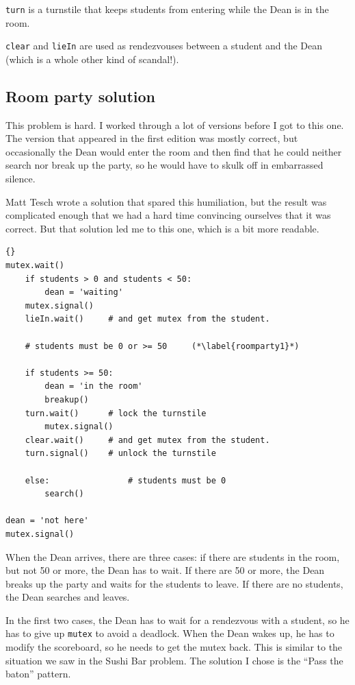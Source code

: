 \documentclass{book}
\newcommand{\clearemptydoublepage}{\newpage\cleardoublepage}
\begin{document}
{\tt turn} is a turnstile that keeps students from entering
while the Dean is in the room.

{\tt clear} and {\tt lieIn} are used as rendezvouses between
a student and the Dean (which is a whole other kind of scandal!).


\clearemptydoublepage
\subsection {Room party solution}

This problem is hard.  I worked through a lot of versions before
I got to this one.  The version that appeared in the first edition
was mostly correct, but occasionally the Dean would enter the
room and then find that he could neither search nor break up the
party, so he would have to skulk off in embarrassed silence.

Matt Tesch wrote a solution that spared this humiliation, but the
result was complicated enough that we had a hard time convincing
ourselves that it was correct.  But that solution led me to this one,
which is a bit more readable.

\begin{latin}
\begin{lstlisting}[title={Room party solution (dean)}]{}
mutex.wait()
    if students > 0 and students < 50:
        dean = 'waiting'
	mutex.signal()
	lieIn.wait()     # and get mutex from the student.

    # students must be 0 or >= 50     (*\label{roomparty1}*)

    if students >= 50:
        dean = 'in the room'
        breakup()
	turn.wait()      # lock the turnstile
        mutex.signal()
	clear.wait()     # and get mutex from the student.
	turn.signal()    # unlock the turnstile

    else:                # students must be 0
        search()

dean = 'not here'
mutex.signal() 
\end{lstlisting}
\end{latin}

When the Dean arrives, there are three cases: if there are students in
the room, but not 50 or more, the Dean has to wait.  If there are 50
or more, the Dean breaks up the party and waits for the students to
leave.  If there are no students, the Dean searches and leaves.

In the first two cases, the Dean has to wait for a rendezvous with a
student, so he has to give up {\tt mutex} to avoid a deadlock.  When
the Dean wakes up, he has to modify the scoreboard, so he needs to get
the mutex back.  This is similar to the situation we saw in the Sushi
Bar problem.  The solution I chose is the ``Pass the baton'' pattern.
\end{document}
